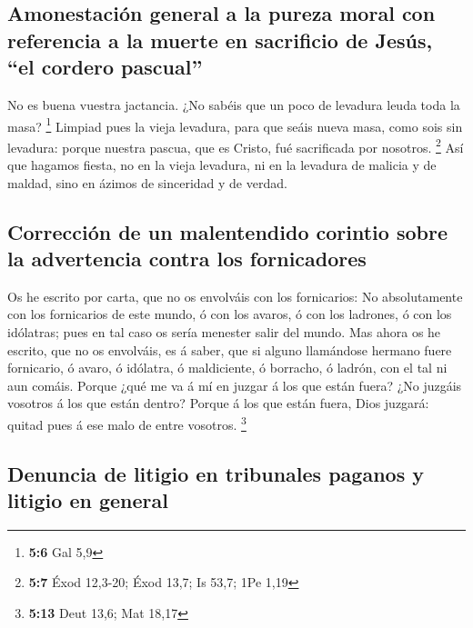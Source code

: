 \hypertarget{amonestaciuxf3n-general-a-la-pureza-moral-con-referencia-a-la-muerte-en-sacrificio-de-jesuxfas-el-cordero-pascual}{%
\subsection{Amonestación general a la pureza moral con referencia a la
muerte en sacrificio de Jesús, ``el cordero
pascual''}\label{amonestaciuxf3n-general-a-la-pureza-moral-con-referencia-a-la-muerte-en-sacrificio-de-jesuxfas-el-cordero-pascual}}

 No es buena vuestra jactancia. ¿No sabéis que un poco de
levadura leuda toda la masa? \footnote{\textbf{5:6} Gal 5,9}
 Limpiad pues la vieja levadura, para que seáis nueva masa,
como sois sin levadura: porque nuestra pascua, que es Cristo, fué
sacrificada por nosotros. \footnote{\textbf{5:7} Éxod 12,3-20; Éxod
  13,7; Is 53,7; 1Pe 1,19}  Así que hagamos fiesta, no en la
vieja levadura, ni en la levadura de malicia y de maldad, sino en ázimos
de sinceridad y de verdad.

\hypertarget{correcciuxf3n-de-un-malentendido-corintio-sobre-la-advertencia-contra-los-fornicadores}{%
\subsection{Corrección de un malentendido corintio sobre la advertencia
contra los
fornicadores}\label{correcciuxf3n-de-un-malentendido-corintio-sobre-la-advertencia-contra-los-fornicadores}}

 Os he escrito por carta, que no os envolváis con los
fornicarios:  No absolutamente con los fornicarios de este
mundo, ó con los avaros, ó con los ladrones, ó con los idólatras; pues
en tal caso os sería menester salir del mundo.  Mas ahora
os he escrito, que no os envolváis, es á saber, que si alguno llamándose
hermano fuere fornicario, ó avaro, ó idólatra, ó maldiciente, ó
borracho, ó ladrón, con el tal ni aun comáis.  Porque ¿qué
me va á mí en juzgar á los que están fuera? ¿No juzgáis vosotros á los
que están dentro?  Porque á los que están fuera, Dios
juzgará: quitad pues á ese malo de entre vosotros. \footnote{\textbf{5:13}
  Deut 13,6; Mat 18,17}

\hypertarget{denuncia-de-litigio-en-tribunales-paganos-y-litigio-en-general}{%
\subsection{Denuncia de litigio en tribunales paganos y litigio en
general}\label{denuncia-de-litigio-en-tribunales-paganos-y-litigio-en-general}}

